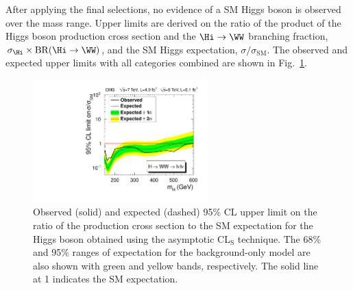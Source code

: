 After applying the final selections, no evidence of
a SM Higgs boson is observed over the mass range. Upper limits 
are derived on the ratio of the product of the Higgs boson 
production cross section and the $\Hi \to \WW$ branching fraction,
$\sigma_{\Hi} \times \mathrm{BR}(\Hi \to \WW)$, and the
SM Higgs expectation, $\sigma/\sigma_\text{SM}$.
The observed and expected
upper limits with all categories combined are shown in
Fig.~\ref{fig:hwwlvlvlim}.

\begin{figure}[htbp]
  \centering
  \includegraphics[width=0.6\textwidth]{figures/WW2l2nuLimit.pdf}
  \caption{\label{fig:hwwlvlvlim}Observed (solid) and expected
    (dashed) 95\% CL upper limit on the ratio of the production cross
    section to the SM expectation for the Higgs boson obtained using
    the asymptotic CL${}_{\textrm{S}}$ technique. The 68\% and 95\%
    ranges of expectation for the background-only model are also shown
    with green and yellow bands, respectively. The solid line at 1
    indicates the SM expectation.} 
\end{figure}


